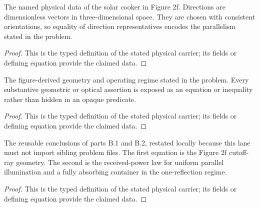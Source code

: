 \begin{definition}
  \label{def:physics:IPhO_2026_2_B_3:aux010}
  The named physical data of the solar cooker in Figure 2f. Directions are dimensionless vectors in three-dimensional space. They are chosen with consistent orientations, so equality of direction representatives encodes the parallelism stated in the problem.
\end{definition}
\begin{proof}
  This is the typed definition of the stated physical carrier; its fields or defining equation provide the claimed data.
\end{proof}

\begin{definition}
  \label{def:physics:IPhO_2026_2_B_3:aux011}
  The figure-derived geometry and operating regime stated in the problem. Every substantive geometric or optical assertion is exposed as an equation or inequality rather than hidden in an opaque predicate.
\end{definition}
\begin{proof}
  This is the typed definition of the stated physical carrier; its fields or defining equation provide the claimed data.
\end{proof}

\begin{definition}
  \label{def:physics:IPhO_2026_2_B_3:aux012}
  The reusable conclusions of parts B.1 and B.2, restated locally because this lane must not import sibling problem files. The first equation is the Figure 2f cutoff-ray geometry. The second is the received-power law for uniform parallel illumination and a fully absorbing container in the one-reflection regime.
\end{definition}
\begin{proof}
  This is the typed definition of the stated physical carrier; its fields or defining equation provide the claimed data.
\end{proof}

